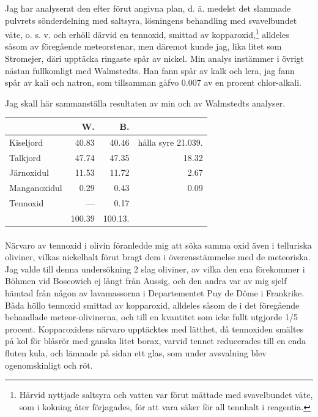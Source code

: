 \documentclass[a4paper, 12pt, oneside, swedish]{article}
\begin{document}
Jag har analyserat den efter förut angivna plan, d. ä. medelst det slammade pulvrets sönderdelning med saltsyra, lösningens behandling med svavelbundet väte, o. s. v. och erhöll därvid en tennoxid, smittad av kopparoxid,\footnote{Härvid nyttjade saltsyra och vatten var förut mättade med svavelbundet väte, som i kokning åter förjagades, för att vara säker för all tennhalt i reagentia.} alldeles såsom av föregående meteorstenar, men däremot kunde jag, lika litet som Stromejer, däri upptäcka ringaste spår av nickel. Min analys instämmer i övrigt nästan fullkomligt med Walmstedts. Han fann spår av kalk och lera, jag fann spår av kali och natron, som tillsamman gåfvo 0.007 av en procent chlor-alkali.

Jag skall här sammanställa resultaten av min och av Walmstedts analyser.
\begin{table}[H]
    \centering\small
    \begin{tabular}{|l|r|r|r|}
    \hline
        ~ & W. & B. & ~ \\ \hline
        Kiseljord & 40.83 & 40.46 & hålla syre 21.039. \\ \hline
        Talkjord & 47.74 & 47.35 & 18.32 \\ \hline
        Järnoxidul & 11.53 & 11.72 & 2.67 \\ \hline
        Manganoxidul & 0.29 & 0.43 & 0.09 \\ \hline
        Tennoxid & --- & 0.17 & ~ \\ \hline
        ~ & 100.39 & 100.13. & ~ \\ \hline
    \end{tabular}
\end{table}
\paragraph{}
Närvaro av tennoxid i olivin föranledde mig att söka samma oxid även i telluriska oliviner, vilkas nickelhalt förut bragt dem i överensstämmelse med de meteoriska. Jag valde till denna undersökning 2 slag oliviner, av vilka den ena förekommer i Böhmen vid Boscowich ej långt från Aussig, och den andra var av mig sjelf hämtad från någon av lavamassorna i Departementet Puy de Dôme i Frankrike. Båda höllo tennoxid smittad av kopparoxid, alldeles såsom de i det föregående behandlade meteor-olivinerna, och till en kvantitet som icke fullt utgjorde 1/5 procent. Kopparoxidens närvaro upptäcktes med lätthet, då tennoxiden smältes på kol för blåsrör med ganska litet borax, varvid tennet reducerades till en enda fluten kula, och lämnade på sidan ett glas, som under avsvalning blev ogenomskinligt och röt.
\end{document}
